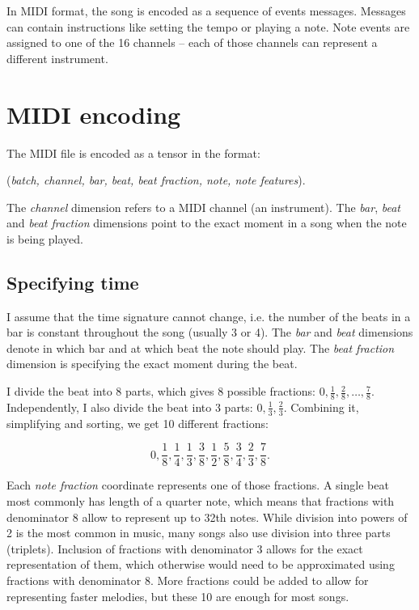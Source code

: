 \documentclass[en]{pracamgr}
\begin{document}
In MIDI format, the song is encoded as a sequence of events messages.
Messages can contain instructions like setting the tempo or playing a note.
Note events are assigned to one of the 16 channels -- each of those channels can represent a different instrument.

\section{MIDI encoding}

The MIDI file is encoded as a tensor in the format:
\begin{center}
    (\emph{batch, channel, bar, beat, beat fraction, note, note features}).
\end{center}

The \emph{channel} dimension refers to a MIDI channel (an instrument).
The \emph{bar}, \emph{beat} and \emph{beat fraction} dimensions point to the exact moment in a song when the note is being played.

\subsection{Specifying time}

I assume that the time signature cannot change, i.e. the number of the beats in a bar is constant throughout the song (usually 3 or 4).
The \emph{bar} and \emph{beat} dimensions denote in which bar and at which beat the note should play.
The \emph{beat fraction} dimension is specifying the exact moment during the beat.

I divide the beat into 8 parts, which gives 8 possible fractions: $0, \frac{1}{8}, \frac{2}{8}, \ldots, \frac{7}{8}$.
Independently, I also divide the beat into 3 parts: $0, \frac{1}{3}, \frac{2}{3}$.
Combining it, simplifying and sorting, we get 10 different fractions:

$$
0, \frac{1}{8}, \frac{1}{4}, \frac{1}{3}, \frac{3}{8}, \frac{1}{2}, \frac{5}{8}, \frac{3}{4}, \frac{2}{3}, \frac{7}{8}.
$$

Each \emph{note fraction} coordinate represents one of those fractions.
A single beat most commonly has length of a quarter note, which means that fractions with denominator 8 allow to represent up to 32th notes.
While division into powers of 2 is the most common in music, many songs also use division into three parts (triplets).
Inclusion of fractions with denominator 3 allows for the exact representation of them, which otherwise would need to be approximated using fractions with denominator 8.
More fractions could be added to allow for representing faster melodies, but these 10 are enough for most songs.
\end{document}
